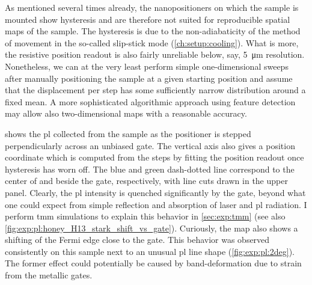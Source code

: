 As mentioned several times already, the nanopositioners on which the sample is mounted show hysteresis and are therefore not suited for reproducible spatial maps of the sample.
The hysteresis is due to the non-adiabaticity of the method of movement in the so-called slip-stick mode (\cf \cref{ch:setup:cooling}).
What is more, the resistive position readout is also fairly unreliable below, say, \qty{5}{\micro\meter} resolution.
Nonetheless, we can at the very least perform simple one-dimensional sweeps after manually positioning the sample at a given starting position and assume that the displacement per step has some sufficiently narrow distribution around a fixed mean.
A more sophisticated algorithmic approach using feature detection may allow also two-dimensional maps with a reasonable accuracy.

 shows the \gls{pl} collected from the sample as the positioner is stepped perpendicularly across an unbiased gate.
The vertical axis also gives a position coordinate which is computed from the steps by fitting the position readout once hysteresis has worn off.
The blue and green dash-dotted line correspond to the center of and beside the gate, respectively, with line cuts drawn in the upper panel.
Clearly, the \gls{pl} intensity is quenched significantly by the gate, beyond what one could expect from simple reflection and absorption of laser and \gls{pl} radiation.
I perform \gls{tmm} simulations to explain this behavior in \cref{sec:exp:tmm} (see also \cref{fig:exp:pl:honey_H13_stark_shift_vs_gate}).
Curiously, the map also shows a shifting of the Fermi edge close to the gate.
This behavior was observed consistently on this sample next to an unusual \gls{pl} line shape (\cf \cref{fig:exp:pl:2deg}).
The former effect could potentially be caused by band-deformation due to strain from the metallic gates.

